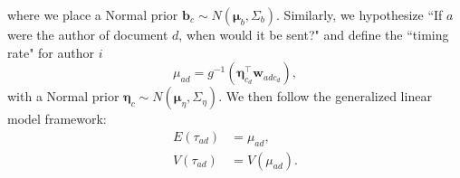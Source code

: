 \documentclass[11pt]{article}
\begin{document}
where we place a Normal prior $\boldsymbol{b}_c \sim N(\boldsymbol{\mu}_b, \Sigma_b)$. Similarly, we hypothesize ``If $a$ were the author of document $d$, when would it be sent?" and define the ``timing rate" for author $i$
\begin{equation}
\mu_{ad} = g^{-1}(\boldsymbol{\eta}_{c_d}^\top \boldsymbol{w}_{adc_d}),
\end{equation}
 with a Normal prior $\boldsymbol{\eta}_c \sim N(\boldsymbol{\mu}_\eta,\Sigma_\eta)$. We then follow the generalized linear model framework:
\begin{equation}
\begin{aligned}
E(\tau_{ad}) &= \mu_{ad},\\
V(\tau_{ad}) &= V(\mu_{ad}).
\end{aligned}
\end{equation}
\end{document}
